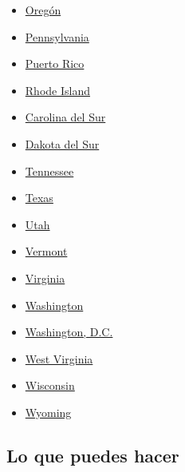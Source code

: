 \begin{itemize}
\item
  \href{https://www.nytimes.com/interactive/2020/us/oregon-coronavirus-cases.html}{Oregón}
\item
  \href{https://www.nytimes.com/interactive/2020/us/pennsylvania-coronavirus-cases.html}{Pennsylvania}
\item
  \href{https://www.nytimes.com/interactive/2020/us/puerto-rico-coronavirus-cases.html}{Puerto
  Rico}
\item
  \href{https://www.nytimes.com/interactive/2020/us/rhode-island-coronavirus-cases.html}{Rhode
  Island}
\item
  \href{https://www.nytimes.com/interactive/2020/us/south-carolina-coronavirus-cases.html}{Carolina
  del Sur}
\item
  \href{https://www.nytimes.com/interactive/2020/us/south-dakota-coronavirus-cases.html}{Dakota
  del Sur}
\item
  \href{https://www.nytimes.com/interactive/2020/us/tennessee-coronavirus-cases.html}{Tennessee}
\item
  \href{https://www.nytimes.com/interactive/2020/us/texas-coronavirus-cases.html}{Texas}
\item
  \href{https://www.nytimes.com/interactive/2020/us/utah-coronavirus-cases.html}{Utah}
\item
  \href{https://www.nytimes.com/interactive/2020/us/vermont-coronavirus-cases.html}{Vermont}
\item
  \href{https://www.nytimes.com/interactive/2020/us/virginia-coronavirus-cases.html}{Virginia}
\item
  \href{https://www.nytimes.com/interactive/2020/us/washington-coronavirus-cases.html}{Washington}
\item
  \href{https://www.nytimes.com/interactive/2020/us/washington-dc-coronavirus-cases.html}{Washington,
  D.C.}
\item
  \href{https://www.nytimes.com/interactive/2020/us/west-virginia-coronavirus-cases.html}{West
  Virginia}
\item
  \href{https://www.nytimes.com/interactive/2020/us/wisconsin-coronavirus-cases.html}{Wisconsin}
\item
  \href{https://www.nytimes.com/interactive/2020/us/wyoming-coronavirus-cases.html}{Wyoming}
\end{itemize}

\hypertarget{lo-que-puedes-hacer}{%
\subsection{Lo que puedes hacer}\label{lo-que-puedes-hacer}}

